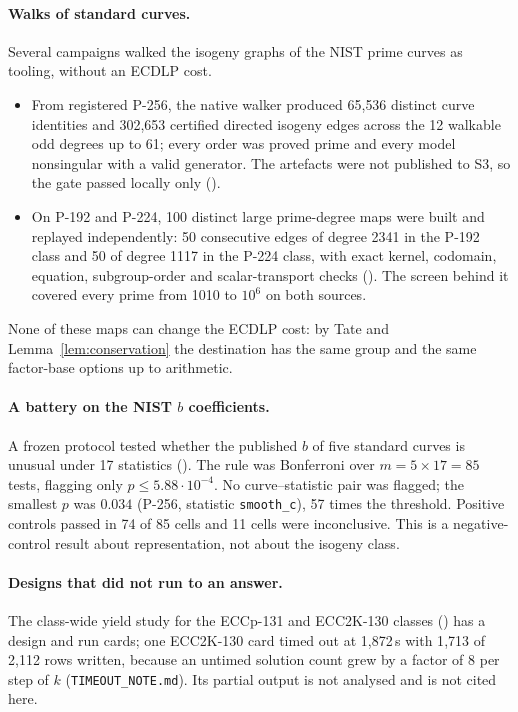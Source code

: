 \paragraph{Walks of standard curves.} Several campaigns walked the
isogeny graphs of the NIST prime curves as tooling, without an ECDLP cost.
\begin{itemize}
\item From registered P-256, the native walker produced 65{,}536 distinct
  curve identities and 302{,}653 certified directed isogeny edges across the 12 walkable odd degrees up to 61; every order was proved prime
  and every model nonsingular with a valid generator. The artefacts were
  not published to S3, so the gate passed locally only
  ().
\item On P-192 and P-224, 100 distinct large prime-degree maps were built
  and replayed independently: 50 consecutive edges of degree 2341 in the
  P-192 class and 50 of degree 1117 in the P-224 class, with exact kernel,
  codomain, equation, subgroup-order and scalar-transport checks
  ().
  The screen behind it covered every prime from 1010 to $10^6$ on both
  sources.
\end{itemize}
None of these maps can change the ECDLP cost: by Tate and
Lemma~\ref{lem:conservation} the destination has the same group and the
same factor-base options up to arithmetic.

\paragraph{A battery on the NIST $b$ coefficients.} A frozen protocol
tested whether the published $b$ of five standard curves is unusual under
17 statistics ().
The rule was Bonferroni over $m=5\times17=85$ tests, flagging only
$p\le5.88\cdot10^{-4}$. No curve--statistic pair was flagged; the smallest
$p$ was $0.034$ (P-256, statistic \texttt{smooth\_c}), 57 times the
threshold. Positive controls passed in 74 of 85 cells and 11 cells were
inconclusive. This is a negative-control result about representation, not
about the isogeny class.

\paragraph{Designs that did not run to an answer.} The class-wide yield
study for the ECCp-131 and ECC2K-130 classes
() has a design and run
cards; one ECC2K-130 card timed out at 1{,}872\,s with 1{,}713 of 2{,}112
rows written, because an untimed solution count grew by a factor of 8 per
step of $k$ (\texttt{TIMEOUT\_NOTE.md}). Its partial output is not analysed
and is not cited here.

